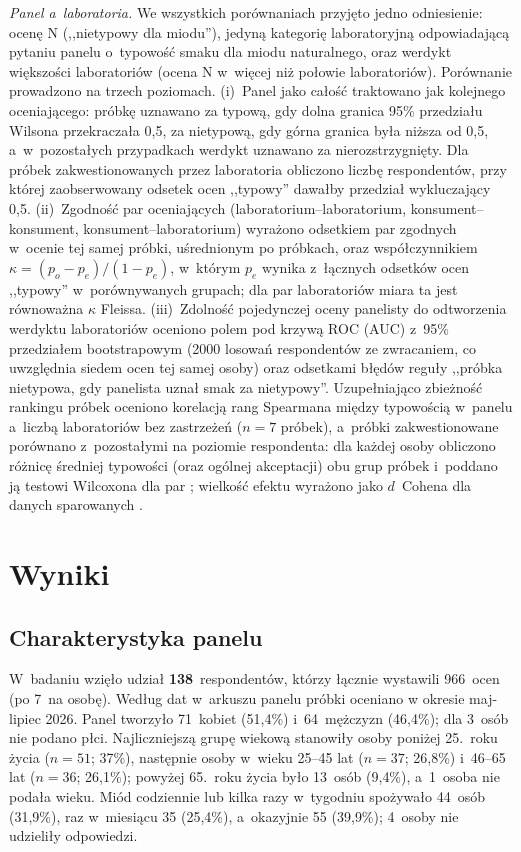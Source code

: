 \textit{Panel a~laboratoria.} We wszystkich porównaniach przyjęto jedno
odniesienie: ocenę N (,,nietypowy dla miodu''), jedyną kategorię
laboratoryjną odpowiadającą pytaniu panelu o~typowość smaku dla miodu
naturalnego, oraz werdykt większości laboratoriów (ocena N w~więcej niż
połowie laboratoriów). Porównanie prowadzono na trzech poziomach.
(i)~Panel jako całość traktowano jak kolejnego oceniającego: próbkę uznawano
za typową, gdy dolna granica 95\% przedziału Wilsona przekraczała 0{,}5, za
nietypową, gdy górna granica była niższa od 0{,}5, a~w~pozostałych
przypadkach werdykt uznawano za nierozstrzygnięty. Dla próbek
zakwestionowanych przez laboratoria obliczono liczbę respondentów, przy
której zaobserwowany odsetek ocen ,,typowy'' dawałby przedział wykluczający
0{,}5. (ii)~Zgodność par oceniających (laboratorium--laboratorium,
konsument--konsument, konsument--laboratorium) wyrażono odsetkiem par
zgodnych w~ocenie tej samej próbki, uśrednionym po próbkach, oraz
współczynnikiem $\kappa = (p_o - p_e)/(1 - p_e)$, w~którym $p_e$ wynika
z~łącznych odsetków ocen ,,typowy'' w~porównywanych grupach; dla par
laboratoriów miara ta jest równoważna $\kappa$ Fleissa. (iii)~Zdolność
pojedynczej oceny panelisty do odtworzenia werdyktu laboratoriów oceniono
polem pod krzywą ROC (AUC) \cite{HanleyMcNeil1982} z~95\% przedziałem
bootstrapowym (2000 losowań respondentów ze zwracaniem, co uwzględnia
siedem ocen tej samej osoby) oraz odsetkami błędów reguły ,,próbka
nietypowa, gdy panelista uznał smak za nietypowy''. Uzupełniająco
zbieżność rankingu próbek oceniono korelacją rang Spearmana między
typowością w~panelu a~liczbą laboratoriów bez zastrzeżeń ($n = 7$ próbek),
a~próbki zakwestionowane porównano z~pozostałymi na poziomie respondenta:
dla każdej osoby obliczono różnicę średniej typowości (oraz ogólnej
akceptacji) obu grup próbek i~poddano ją testowi Wilcoxona dla par
\cite{Wilcoxon1945}; wielkość efektu wyrażono jako $d$~Cohena dla danych
sparowanych \cite{Cohen1988}.

\section{Wyniki}

\subsection{Charakterystyka panelu}

W~badaniu wzięło udział \textbf{138}~respondentów, którzy
łącznie wystawili 966~ocen (po 7~na osobę). Według dat
w~arkuszu panelu próbki oceniano w okresie maj-lipiec 2026.
Panel tworzyło 71~kobiet (51{,}4\%) i~64~mężczyzn
(46{,}4\%); dla 3~osób nie podano płci.
Najliczniejszą grupę wiekową stanowiły osoby poniżej 25.~roku życia
($n = 51$; 37\%), następnie osoby w~wieku
25--45 lat ($n = 37$; 26{,}8\%) i~46--65 lat
($n = 36$; 26{,}1\%); powyżej 65.~roku życia było
13~osób (9{,}4\%), a~1~osoba nie podała
wieku. Miód codziennie lub kilka razy w~tygodniu spożywało
44~osób (31{,}9\%), raz w~miesiącu
35 (25{,}4\%), a~okazyjnie
55 (39{,}9\%); 4~osoby
nie udzieliły odpowiedzi.

